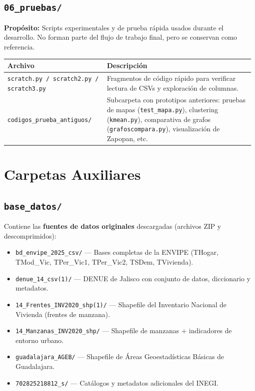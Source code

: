 \documentclass[12pt, a4paper]{article}
\begin{document}
\subsection{\texttt{06\_pruebas/}}

\textbf{Propósito:} Scripts experimentales y de prueba rápida usados durante el desarrollo. No forman parte del flujo de trabajo final, pero se conservan como referencia.

\begin{table}[h!]
\centering
\small
\begin{tabular}{p{6cm} p{8cm}}
\toprule
\textbf{Archivo} & \textbf{Descripción} \\
\midrule
\texttt{scratch.py / scratch2.py / scratch3.py} & Fragmentos de código rápido para verificar lectura de CSVs y exploración de columnas. \\
\addlinespace
\texttt{codigos\_prueba\_antiguos/} & Subcarpeta con prototipos anteriores: pruebas de mapas (\texttt{test\_mapa.py}), clustering (\texttt{kmean.py}), comparativa de grafos (\texttt{grafoscompara.py}), visualización de Zapopan, etc. \\
\bottomrule
\end{tabular}
\end{table}

\section{Carpetas Auxiliares}

\subsection{\texttt{base\_datos/}}
Contiene las \textbf{fuentes de datos originales} descargadas (archivos ZIP y descomprimidos):
\begin{itemize}[nosep]
    \item \texttt{bd\_envipe\_2025\_csv/} --- Bases completas de la ENVIPE (THogar, TMod\_Vic, TPer\_Vic1, TPer\_Vic2, TSDem, TVivienda).
    \item \texttt{denue\_14\_csv(1)/} --- DENUE de Jalisco con conjunto de datos, diccionario y metadatos.
    \item \texttt{14\_Frentes\_INV2020\_shp(1)/} --- Shapefile del Inventario Nacional de Vivienda (frentes de manzana).
    \item \texttt{14\_Manzanas\_INV2020\_shp/} --- Shapefile de manzanas + indicadores de entorno urbano.
    \item \texttt{guadalajara\_AGEB/} --- Shapefile de Áreas Geoestadísticas Básicas de Guadalajara.
    \item \texttt{702825218812\_s/} --- Catálogos y metadatos adicionales del INEGI.
\end{itemize}
\end{document}
